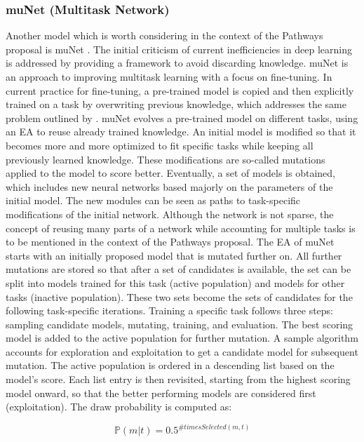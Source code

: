 \documentclass[
]{krantz}
\begin{document}
\hypertarget{munet-multitask-network}{%
\subsubsection{muNet (Multitask Network)}\label{munet-multitask-network}}

Another model which is worth considering in the context of the Pathways proposal is muNet \citep{Gesmundo2022a}. The initial criticism of current inefficiencies in deep learning is addressed by providing a framework to avoid discarding knowledge. muNet is an approach to improving multitask learning with a focus on fine-tuning. In current practice for fine-tuning, a pre-trained model is copied and then explicitly trained on a task by overwriting previous knowledge, which addresses the same problem outlined by \citet{Dean21}.
muNet evolves a pre-trained model on different tasks, using an EA to reuse already trained knowledge. An initial model is modified so that it becomes more and more optimized to fit specific tasks while keeping all previously learned knowledge. These modifications are so-called mutations applied to the model to score better. Eventually, a set of models is obtained, which includes new neural networks based majorly on the parameters of the initial model. The new modules can be seen as paths to task-specific modifications of the initial network. Although the network is not sparse, the concept of reusing many parts of a network while accounting for multiple tasks is to be mentioned in the context of the Pathways proposal.
The EA of muNet starts with an initially proposed model that is mutated further on. All further mutations are stored so that after a set of candidates is available, the set can be split into models trained for this task (active population) and models for other tasks (inactive population). These two sets become the sets of candidates for the following task-specific iterations.
Training a specific task follows three steps: sampling candidate models, mutating, training, and evaluation. The best scoring model is added to the active population for further mutation. A sample algorithm accounts for exploration and exploitation to get a candidate model for subsequent mutation. The active population is ordered in a descending list based on the model's score. Each list entry is then revisited, starting from the highest scoring model onward, so that the better performing models are considered first (exploitation). The draw probability is computed as:

\[\mathbb P(m|t) = 0.5 ^{ \#timesSelected(m, t)}\]
\end{document}
